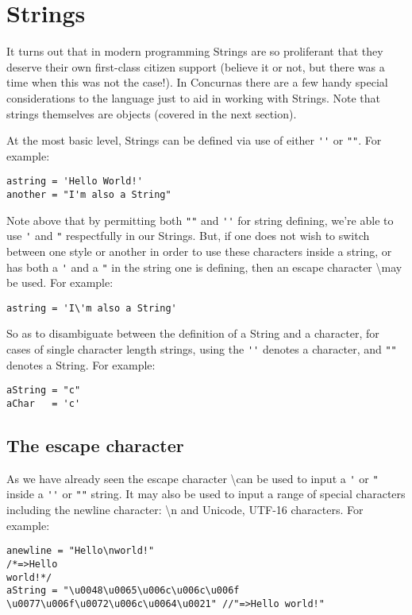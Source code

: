 \documentclass[conc-doc]{subfiles}
\begin{document}
\section{Strings}
It turns out that in modern programming Strings are so proliferant that they deserve their own first-class citizen support (believe it or not, but there was a time when this was not the case!). In Concurnas there are a few handy special considerations to the language just to aid in working with Strings. Note that strings themselves are objects (covered in the next section).

At the most basic level, Strings can be defined via use of either \lstinline{''} or \lstinline{""}. For example:
\begin{lstlisting}
astring = 'Hello World!'
another = "I'm also a String"
\end{lstlisting}

Note above that by permitting both \lstinline{""} and \lstinline{''} for string defining, we're able to use \lstinline{'} and \lstinline{"} respectfully in our Strings. But, if one does not wish to switch between one style or another in order to use these characters inside a string, or has both a \lstinline{'} and a \lstinline{"} in the string one is defining, then an escape character \textbackslash may be used. For example:
\begin{lstlisting}
astring = 'I\'m also a String'
\end{lstlisting}

So as to disambiguate between the definition of a String and a character, for cases of single character length strings, using the \lstinline{''} denotes a character, and \lstinline{""} denotes a String. For example:
\begin{lstlisting}
aString = "c"
aChar   = 'c'
\end{lstlisting}

\subsection{The escape character}
As we have already seen the escape character \textbackslash can be used to input a \lstinline{'} or \lstinline{"} inside a \lstinline{''} or \lstinline{""} string. It may also be used to input a range of special characters including the newline character: \textbackslash n and Unicode, UTF-16 characters. For example:

\begin{lstlisting}
anewline = "Hello\nworld!"
/*=>Hello
world!*/
aString = "\u0048\u0065\u006c\u006c\u006f \u0077\u006f\u0072\u006c\u0064\u0021" //"=>Hello world!"
\end{lstlisting}
\end{document}
